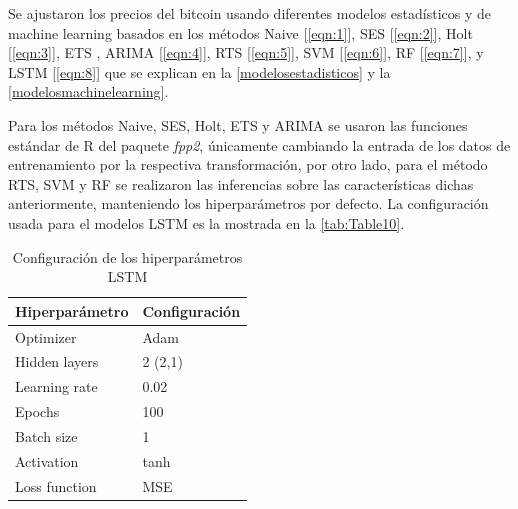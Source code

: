 Se ajustaron los precios del bitcoin usando diferentes modelos estadísticos y de machine learning basados en los métodos Naive [\ref{eqn:1}], SES [\ref{eqn:2}], Holt [\ref{eqn:3}], ETS \footnotemark , ARIMA [\ref{eqn:4}], RTS [\ref{eqn:5}], SVM [\ref{eqn:6}], RF [\ref{eqn:7}], y LSTM [\ref{eqn:8}] que se explican en la \autoref{modelosestadisticos} y la \autoref{modelosmachinelearning}.

Para los métodos Naive, SES, Holt, ETS y ARIMA se usaron las funciones estándar de R del paquete \emph{fpp2}, únicamente cambiando la entrada de los datos de entrenamiento por la respectiva transformación, por otro lado, para el método RTS, SVM y RF se realizaron las inferencias sobre las características dichas anteriormente, manteniendo los hiperparámetros por defecto. La configuración usada para el modelos LSTM es la mostrada en la \autoref{tab:Table10}.

\begin{table}[!h]
	\centering
	\begin{tabular}{p{4cm} p{4cm}  }
		\toprule
		\textbf{Hiperparámetro} & \textbf{Configuración}\\
		\midrule
		Optimizer & Adam\\
		Hidden layers & 2 (2,1)\\
		Learning rate & 0.02\\
		Epochs & 100\\
		Batch size & 1\\
		Activation & tanh\\
		Loss function & MSE\\
		\bottomrule
		\hline
	\end{tabular}
	\caption{Configuración de los hiperparámetros LSTM}
	\label{tab:Table10}
\end{table}

